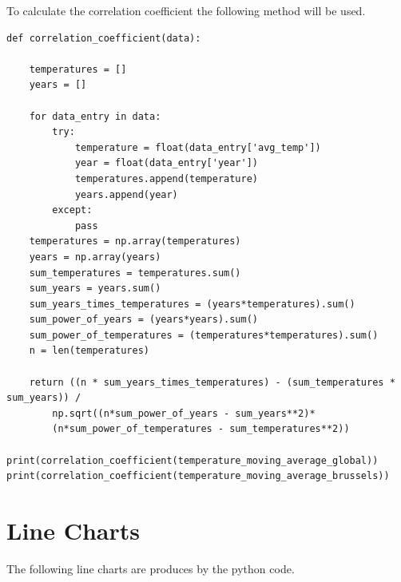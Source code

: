 \documentclass{article}
\begin{document}
To calculate the correlation coefficient the following method will be used.

\begin{lstlisting}
def correlation_coefficient(data):

	temperatures = []
	years = []

	for data_entry in data:
		try:
			temperature = float(data_entry['avg_temp'])
			year = float(data_entry['year'])
			temperatures.append(temperature)
			years.append(year)
		except:
			pass
	temperatures = np.array(temperatures)
	years = np.array(years)
	sum_temperatures = temperatures.sum()
	sum_years = years.sum()
	sum_years_times_temperatures = (years*temperatures).sum()
	sum_power_of_years = (years*years).sum()
	sum_power_of_temperatures = (temperatures*temperatures).sum()
	n = len(temperatures)

	return ((n * sum_years_times_temperatures) - (sum_temperatures * sum_years)) / 
		np.sqrt((n*sum_power_of_years - sum_years**2)*
		(n*sum_power_of_temperatures - sum_temperatures**2))

print(correlation_coefficient(temperature_moving_average_global))
print(correlation_coefficient(temperature_moving_average_brussels))

\end{lstlisting}

\section{Line Charts}
The following line charts are produces by the python code.
\end{document}
